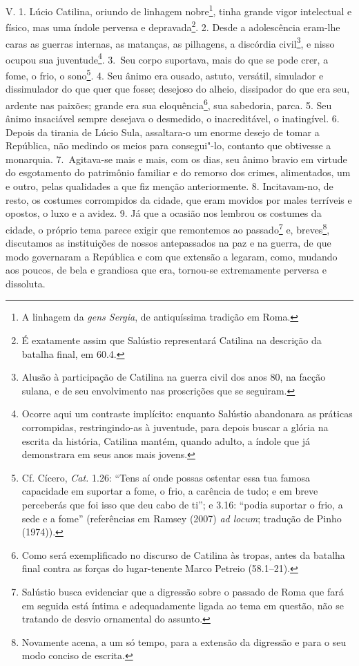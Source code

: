 V. 1. Lúcio Catilina, oriundo de linhagem nobre\footnote{A linhagem da
\emph{gens Sergia}, de antiquíssima tradição em Roma.}, tinha grande vigor
intelectual e físico, mas uma índole perversa e depravada\footnote{É exatamente
assim que Salústio representará Catilina na descrição da batalha final, em 60.4.}. 2. Desde a adolescência eram-lhe caras as guerras internas, as matanças,
as pilhagens, a discórdia civil\footnote{Alusão à participação de Catilina na
guerra civil dos anos 80, na facção sulana, e de seu envolvimento nas
proscrições que se seguiram.}, e nisso ocupou sua juventude\footnote{Ocorre
aqui um contraste implícito: enquanto Salústio abandonara as práticas
corrompidas, restringindo-as à juventude, para depois buscar a glória na
escrita da história, Catilina mantém, quando adulto, a índole que já
demonstrara em seus anos mais jovens.}. 3.~Seu corpo suportava, mais do que se
pode crer, a fome, o frio, o sono\footnote{Cf. Cícero, \emph{Cat.} 1.26:  ``Tens aí onde possas ostentar essa tua famosa capacidade em suportar a
fome, o frio, a carência de tudo; e em breve perceberás que foi isso que deu
cabo de ti''; e 3.16: ``podia suportar o frio, a sede e a fome'' (referências
em Ramsey (2007) \emph{ad locum}; tradução de Pinho (1974)).}. 4. Seu ânimo era
ousado, astuto, versátil, simulador e dissimulador do que quer que fosse;
desejoso do alheio, dissipador do que era seu, ardente nas paixões; grande era
sua eloquência\footnote{Como será exemplificado no
discurso de Catilina às tropas, antes da batalha final contra as forças do
lugar-tenente Marco Petreio (58.1--21).}, sua sabedoria, parca. 5. Seu ânimo insaciável sempre
desejava o desmedido, o inacreditável, o inatingível. 6. Depois da tirania de
Lúcio Sula, assaltara-o um enorme desejo de tomar a República, não medindo os
meios para consegui"-lo, contanto que obtivesse a monarquia. 7.~Agitava-se mais
e mais, com os dias, seu ânimo bravio em virtude do esgotamento do patrimônio
familiar e do remorso dos crimes, alimentados, um e outro, pelas qualidades a
que fiz menção anteriormente. 8. Incitavam-no, de resto, os costumes
corrompidos da cidade, que eram movidos por males terríveis e opostos, o luxo e
a avidez. 9. Já que a ocasião nos lembrou os costumes da cidade, o próprio tema
parece exigir que remontemos ao passado\footnote{Salústio busca evidenciar que
a digressão sobre o passado de Roma que fará em seguida está íntima e
adequadamente ligada ao tema em questão, não se tratando de desvio ornamental
do assunto.} e, breves\footnote{Novamente acena, a um só tempo, para a extensão
da digressão e para o seu modo conciso de escrita.}, discutamos as instituições
de nossos antepassados na paz e na guerra, de que modo governaram a República e
com que extensão a legaram, como, mudando aos poucos, de bela e grandiosa que
era, tornou-se extremamente perversa e dissoluta.

